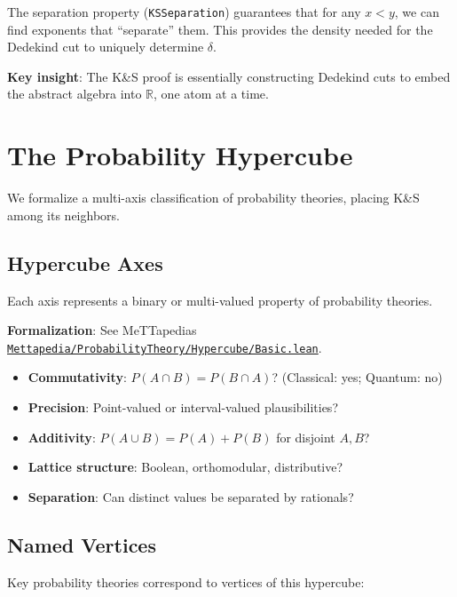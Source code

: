 \documentclass[11pt]{article}
\theoremstyle{definition}
\theoremstyle{remark}
\begin{document}
The separation property (\texttt{KSSeparation}) guarantees that for any $x < y$, we can find exponents that ``separate'' them.
This provides the density needed for the Dedekind cut to uniquely determine $\delta$.

\textbf{Key insight}: The K\&S proof is essentially constructing Dedekind cuts to embed the abstract algebra into $\mathbb{R}$, one atom at a time.

\section{The Probability Hypercube}
\label{app:hypercube}

We formalize a multi-axis classification of probability theories, placing K\&S among its neighbors.

\subsection{Hypercube Axes}

Each axis represents a binary or multi-valued property of probability theories.

\textbf{Formalization}: See MeTTapedia\textquotesingle s \href{https://github.com/zariuq/MeTTapedia/blob/main/lean/mettapedia/Mettapedia/ProbabilityTheory/Hypercube/Basic.lean}{\texttt{Mettapedia/ProbabilityTheory/Hypercube/Basic.lean}}.

\begin{itemize}
\item \textbf{Commutativity}: $P(A \cap B) = P(B \cap A)$? (Classical: yes; Quantum: no)
\item \textbf{Precision}: Point-valued or interval-valued plausibilities?
\item \textbf{Additivity}: $P(A \cup B) = P(A) + P(B)$ for disjoint $A, B$?
\item \textbf{Lattice structure}: Boolean, orthomodular, distributive?
\item \textbf{Separation}: Can distinct values be separated by rationals?
\end{itemize}

\subsection{Named Vertices}

Key probability theories correspond to vertices of this hypercube:
\end{document}
